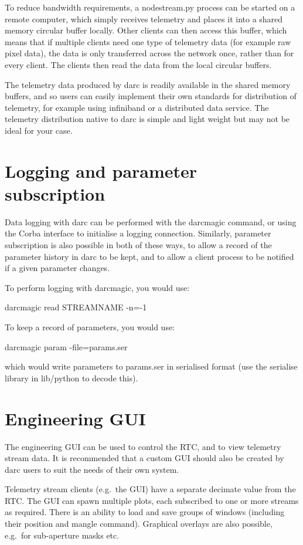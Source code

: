 \documentclass[a4,10pt]{article}
\begin{document}
To reduce bandwidth requirements, a nodestream.py process can be
started on a remote computer, which simply receives telemetry and
places it into a shared memory circular buffer locally.  Other clients
can then access this buffer, which means that if multiple clients need
one type of telemetry data (for example raw pixel data), the data is
only transferred across the network once, rather than for every
client.  The clients then read the data from the local circular buffers.

The telemetry data produced by darc is readily available in the shared
memory buffers, and so users can easily implement their own standards
for distribution of telemetry, for example using infiniband or a
distributed data service.  The telemetry distribution native to darc
is simple and light weight but may not be ideal for your case.  

\section{Logging and parameter subscription}
Data logging with darc can be performed with the darcmagic command, or
using the Corba interface to initialise a logging connection.
Similarly, parameter subscription is also possible in both of these
ways, to allow a record of the parameter history in darc to be kept,
and to allow a client process to be notified if a given parameter changes.

To perform logging with darcmagic, you would use:

darcmagic read STREAMNAME -n=-1

To keep a record of parameters, you would use:

darcmagic param -file=params.ser

which would write parameters to params.ser in serialised format (use
the serialise library in lib/python to decode this).


\section{Engineering GUI}
The engineering GUI can be used to control the RTC, and to view
telemetry stream data.  It is recommended that a custom GUI should
also be created by darc users to suit the needs of their own system.

Telemetry stream clients (e.g.\ the GUI) have a separate decimate
value from the RTC.  The GUI can
spawn multiple plots, each subscribed to one or more streams as
required.  There is an ability to load and save groups of windows
(including their position and mangle command).  Graphical overlays are
also possible, e.g.\ for sub-aperture masks etc.
\end{document}
